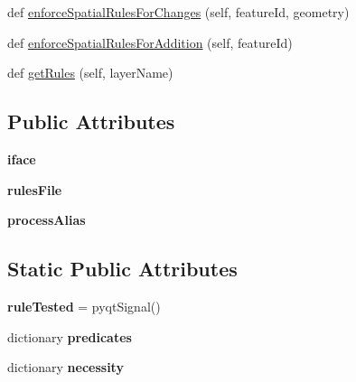 \begin{DoxyCompactItemize}
\item 
def \mbox{\hyperlink{class_dsg_tools_1_1_validation_tools_1_1_validation_processes_1_1spatial_rule_enforcer_1_1_spatial_rule_enforcer_aa03241b2175d5c8a4027555f5624b965}{enforce\+Spatial\+Rules\+For\+Changes}} (self, feature\+Id, geometry)
\item 
def \mbox{\hyperlink{class_dsg_tools_1_1_validation_tools_1_1_validation_processes_1_1spatial_rule_enforcer_1_1_spatial_rule_enforcer_a6e6d9d10507f9712fbdb42a6d858f3f5}{enforce\+Spatial\+Rules\+For\+Addition}} (self, feature\+Id)
\item 
def \mbox{\hyperlink{class_dsg_tools_1_1_validation_tools_1_1_validation_processes_1_1spatial_rule_enforcer_1_1_spatial_rule_enforcer_a5154552ccfe6d67c64a9198c705f3581}{get\+Rules}} (self, layer\+Name)
\end{DoxyCompactItemize}
\subsection*{Public Attributes}
\begin{DoxyCompactItemize}
\item 
\mbox{\label{class_dsg_tools_1_1_validation_tools_1_1_validation_processes_1_1spatial_rule_enforcer_1_1_spatial_rule_enforcer_a81f206ea526d73f4835e79bfcc58c2e1}} 
{\bfseries iface}
\item 
\mbox{\label{class_dsg_tools_1_1_validation_tools_1_1_validation_processes_1_1spatial_rule_enforcer_1_1_spatial_rule_enforcer_a5a61e570809bb2ef0137af934d80de83}} 
{\bfseries rules\+File}
\item 
\mbox{\label{class_dsg_tools_1_1_validation_tools_1_1_validation_processes_1_1spatial_rule_enforcer_1_1_spatial_rule_enforcer_ae70a56fd7584583f8f9ea6830e97ea73}} 
{\bfseries process\+Alias}
\end{DoxyCompactItemize}
\subsection*{Static Public Attributes}
\begin{DoxyCompactItemize}
\item 
\mbox{\label{class_dsg_tools_1_1_validation_tools_1_1_validation_processes_1_1spatial_rule_enforcer_1_1_spatial_rule_enforcer_a5a0e27b3d2f7b4e650c96a33f4cf2614}} 
{\bfseries rule\+Tested} = pyqt\+Signal()
\item 
dictionary {\bfseries predicates}
\item 
dictionary {\bfseries necessity}
\end{DoxyCompactItemize}


